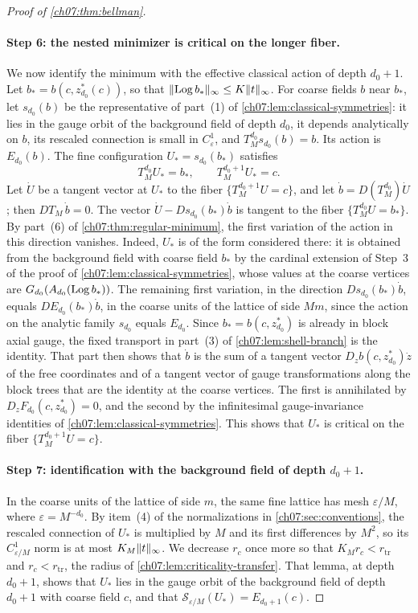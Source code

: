 \begin{proof}[Proof of \cref{ch07:thm:bellman}]
\paragraph{Step 6: the nested minimizer is critical on the longer fiber.}
We now identify the minimum with the effective classical action of depth $d_0+1$. Let $b_*=b(c,z_{d_0}^*(c))$, so that $\lVert \operatorname{Log} b_*\rVert_\infty\le K\lVert t\rVert_\infty$. For coarse fields $b$ near $b_*$, let $s_{d_0}(b)$ be the representative of part~(1) of \cref{ch07:lem:classical-symmetries}: it lies in the gauge orbit of the background field of depth $d_0$, it depends analytically on $b$, its rescaled connection is small in $C^1_\varepsilon$, and $T_M^{d_0}s_{d_0}(b)=b$. Its action is $E_{d_0}(b)$. The fine configuration $U_*=s_{d_0}(b_*)$ satisfies
\[
 T_M^{d_0}U_*=b_*,\qquad T_M^{d_0+1}U_*=c .
\]
Let $\dot U$ be a tangent vector at $U_*$ to the fiber $\{T_M^{d_0+1}U=c\}$, and let $\dot b=D(T_M^{d_0})\dot U$; then $D T_M\,\dot b=0$. The vector $\dot U-Ds_{d_0}(b_*)\dot b$ is tangent to the fiber $\{T_M^{d_0}U=b_*\}$. By part~(6) of \cref{ch07:thm:regular-minimum}, the first variation of the action in this direction vanishes. Indeed, $U_*$ is of the form considered there: it is obtained from the background field with coarse field $b_*$ by the cardinal extension of Step~3 of the proof of \cref{ch07:lem:classical-symmetries}, whose values at the coarse vertices are $G_{d_0}(A_{d_0}(\operatorname{Log} b_*))$. The remaining first variation, in the direction $Ds_{d_0}(b_*)\dot b$, equals $DE_{d_0}(b_*)\dot b$, in the coarse units of the lattice of side $Mm$, since the action on the analytic family $s_{d_0}$ equals $E_{d_0}$. Since $b_*=b(c,z_{d_0}^*)$ is already in block axial gauge, the fixed transport in part~(3) of \cref{ch07:lem:shell-branch} is the identity. That part then shows that $\dot b$ is the sum of a tangent vector $D_zb(c,z_{d_0}^*)\dot z$ of the free coordinates and of a tangent vector of gauge transformations along the block trees that are the identity at the coarse vertices. The first is annihilated by $D_zF_{d_0}(c,z_{d_0}^*)=0$, and the second by the infinitesimal gauge-invariance identities of \cref{ch07:lem:classical-symmetries}. This shows that $U_*$ is critical on the fiber $\{T_M^{d_0+1}U=c\}$.

\paragraph{Step 7: identification with the background field of depth $d_0+1$.}
In the coarse units of the lattice of side $m$, the same fine lattice has mesh $\varepsilon/M$, where $\varepsilon=M^{-d_0}$. By item~(4) of the normalizations in \cref{ch07:sec:conventions}, the rescaled connection of $U_*$ is multiplied by $M$ and its first differences by $M^2$, so its $C^1_{\varepsilon/M}$ norm is at most $K_M\lVert t\rVert_\infty$. We decrease $r_c$ once more so that $K_Mr_c<r_{\mathrm{tr}}$ and $r_c<r_{\mathrm{tr}}$, the radius of \cref{ch07:lem:criticality-transfer}. That lemma, at depth $d_0+1$, shows that $U_*$ lies in the gauge orbit of the background field of depth $d_0+1$ with coarse field $c$, and that $\mathscr S_{\varepsilon/M}(U_*)=E_{d_0+1}(c)$.


\end{proof}
